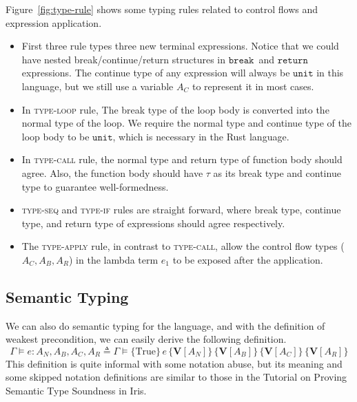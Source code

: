 \documentclass{article}
\numberwithin{algorithm}{section}
\newcommand{\progspec}[1]{\{ #1 \}}
\newcommand{\cbreak}{\texttt{break}\,}
\newcommand{\creturn}{\texttt{return}\,}
\newcommand{\tunit}{\texttt{unit}}
\newcommand{\vtype}[1]{\textbf{V}[#1]}
\newcommand{\htriple}[6]{\progspec{#1}\, #2\, \progspec{#3}\, \progspec{#4}\, \progspec{#5}\, \progspec{#6}}
\begin{document}
Figure~\ref{fig:type-rule} shows some typing rules related to control flows and expression application.
\begin{itemize}
    \item First three rule types three new terminal expressions. Notice that we could have nested break/continue/return structures in $\cbreak\!$ and $\creturn\!$ expressions. The continue type of any expression will always be $\tunit$ in this language, but we still use a variable $A_C$ to represent it in most cases.
    \item In \textsc{type-loop} rule, The break type of the loop body is converted into the normal type of the loop. We require the normal type and continue type of the loop body to be $\tunit$, which is necessary in the Rust language.
    \item In \textsc{type-call} rule, the normal type and return type of function body should agree. Also, the function body should have $\tau$ as its break type and continue type to guarantee well-formedness.
    \item \textsc{type-seq} and \textsc{type-if} rules are straight forward, where break type, continue type, and return type of expressions should agree respectively.
    \item The \textsc{type-apply} rule, in contrast to \textsc{type-call}, allow the control flow types ($A_C, A_B, A_R$) in the lambda term $e_1$ to be exposed after the application.
\end{itemize}


\subsection{Semantic Typing}

We can also do semantic typing for the language, and with the definition of weakest precondition, we can easily derive the following definition.
$$
\Gamma \vDash e: A_N, A_B, A_C, A_R \triangleq \Gamma \vDash \htriple{\text{True}}{e}{\vtype{A_N}}{\vtype{A_B}}{\vtype{A_C}}{\vtype{A_R}}
$$
This definition is quite informal with some notation abuse, but its meaning and some skipped notation definitions are similar to those in the Tutorial on Proving Semantic Type Soundness in Iris.
\end{document}
